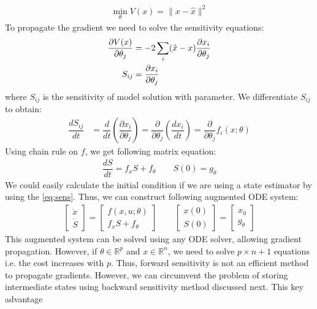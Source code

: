 \documentclass[fontsize=11pt]{article}
\newcommand{\R}{\mathbb{R}}
\newcommand{\norm}[1]{\lVert #1 \rVert}
\theoremstyle{definition}
\begin{document}
\begin{align}
    \min\limits_{\theta} V(x) = \norm{x - \hat{x}}^2 
\end{align}
To propagate the gradient we need to solve the sensitivity equations:
\begin{align}
    \dfrac{\partial V(x)}{\partial \theta_j} &= -2 \sum_i (\hat{x} - x) \dfrac{\partial x_i}{\partial \theta_j} \notag \\ 
    S_{ij} &= \dfrac{\partial x_i}{\partial \theta_j}
    \label{eq:sens}
\end{align}
where $S_{ij}$ is the sensitivity of model solution with parameter. We differentiate $S_{ij}$ to obtain:
\begin{align}
    \dfrac{d S_{ij}}{dt} &= \dfrac{d}{dt} \left(\dfrac{\partial x_i}{\partial \theta_j}\right) =
    \dfrac{\partial}{\partial\theta_j} \left(\dfrac{d x_i}{dt}\right) = 
    \dfrac{\partial }{\partial \theta_j} f_i(x; \theta) 
\end{align}
Using chain rule on $f$, we get following matrix equation:
\begin{align}
    \dfrac{dS}{dt} = f_xS + f_{\theta} \qquad  S(0) = g_\theta
\end{align}
We could easily calculate the initial condition 
if we are using a state estimator by using the \cref{eq:sens}. Thus, we can construct
following augmented ODE system:
\begin{align}
    \begin{bmatrix} \dot{x} \\ \dot{S} \end{bmatrix} = 
    \begin{bmatrix} f(x, u; \theta) \\ f_xS + f_{\theta} \end{bmatrix}
    \qquad
    \begin{bmatrix} x(0) \\ S(0) \end{bmatrix} =
    \begin{bmatrix} x_0 \\ g_\theta \end{bmatrix}
    \label{eq:augsens}
\end{align}
This augmented system can be solved using any ODE solver, allowing gradient 
propagation. However, if $\theta \in \R^{p}$ and $x \in \R^{n}$, we need to 
solve $p \times n + 1$ equations i.e. the cost increases with $p$. Thus, forward
sensitivity is not an efficient method to propagate gradients. However, we can circumvent
the problem of storing intermediate states using backward sensitivity method discussed next. This key advantage 
\end{document}
